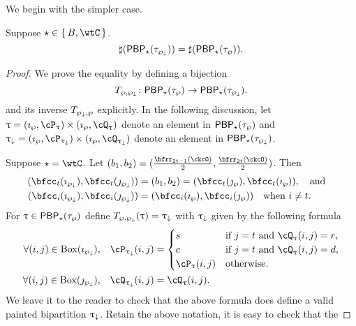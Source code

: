 \documentclass[counting_main.tex]{subfiles}
\begin{document}
We begin with the simpler case.
\begin{lem}
  Suppose $\star \in \set{B, \wtC}$.
  \[
    \sharp(\mathsf{PBP}_{\star}(\tau_{\wp_{\downarrow}})) = \sharp(\mathsf{PBP}_{\star}(\tau_{\wp})).
  \]
\end{lem}
\begin{proof}
  We prove the equality by defining a bijection
  \[
    T_{\wp,\wp_{\downarrow}}\colon \mathsf{PBP}_{\star}(\tau_{\wp}) \rightarrow \mathsf{PBP}_{\star}(\tau_{\wp_{\downarrow}}).
  \]
  and its inverse $T_{\wp_{\downarrow},\wp}$ explicitly. In the following discussion, let
  $\uptau = (\imath_{\wp},\cP_{\uptau})\times (\imath_{\wp},\cQ_{\uptau})$
  denote an element in $\mathsf{PBP}_{\star}(\tau_{\wp})$ and
  $\uptaum = (\imath_{\wp},\cP_{\uptaum})\times (\imath_{\wp},\cQ_{\uptaum})$
  denote an element in $\mathsf{PBP}_{\star}(\tau_{\wp_{\downarrow}})$.

  Suppose $\star = \wtC$. Let
  $(b_{1},b_{2}) = (\frac{\bfrr_{2t-1}(\ckcO)}{2},\frac{\bfrr_{2t}(\ckcO)}{2})$.
  Then
  \[
    \begin{split}
      (\bfcc_{t}(\imath_{\PPm}), \bfcc_{t}(\jmath_{\PPm}))
      &= (b_{1},b_{2})= (\bfcc_{t}(\jmath_{\wp}), \bfcc_{t}(\imath_{\wp})),\AND\\
      (\bfcc_{i}(\imath_{\PPm}), \bfcc_{i}(\jmath_{\PPm}) )
      & = (\bfcc_{i}(\imath_{\wp}), \bfcc_{i}(\jmath_{\wp}) ) \quad \text{when $i\neq t$}.
    \end{split}
  \]
  For $\uptau\in\mathsf{PBP}_{\star}(\tau_{\wp})$ define $T_{\wp,\wp_{\downarrow}}(\uptau) = \uptau_{\downarrow}$  with
  $\uptau_{\downarrow}$ given
  by the following formula
  \[
    \begin{split}
      \text{$\forall (i,j)\in \BOX{\imath_{\PPm}}$,} \quad \cP_{\uptaum}(i,j) &= \begin{cases}
        s& \text{if $j=t$ and  $\cQ_{\uptau}(i,j)=r$,}\\
        c& \text{if $j=t$ and  $\cQ_{\uptau}(i,j)=d$,}\\
        \cP_{\uptau}(i,j) &\text{otherwise.}
      \end{cases}\\
      \text{$\forall (i,j)\in \BOX{\jmath_{\PPm}}$,} \quad   \cQ_{\uptaum}(i,j) &=  \cQ_{\uptau}(i,j).\\
    \end{split}
  \]
  We leave it to the reader to check that the above formula does define a valid
  painted bipartition $\uptau_{\downarrow}$. Retain the above notation, it is easy to check that the

\end{proof}
\end{document}

